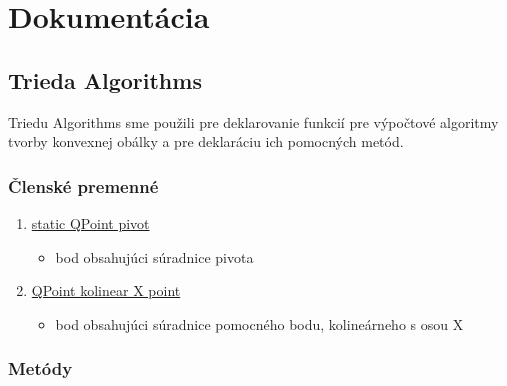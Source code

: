 \documentclass[12pt]{article}
\begin{document}
\section{Dokumentácia}
\subsection{Trieda Algorithms}
Triedu Algorithms sme použili pre deklarovanie funkcií pre výpočtové algoritmy tvorby konvexnej obálky a pre deklaráciu ich pomocných metód.

\subsubsection{Členské premenné}

\begin{enumerate}
\item[] \underline{static QPoint pivot} 
\begin{itemize}
\item bod obsahujúci súradnice pivota
\end{itemize}
\item[] \underline{QPoint kolinear X point} 
\begin{itemize}
\item bod obsahujúci súradnice pomocného bodu, kolineárneho s osou X
\end{itemize}
\end{enumerate}

\subsubsection{Metódy}
\end{document}
